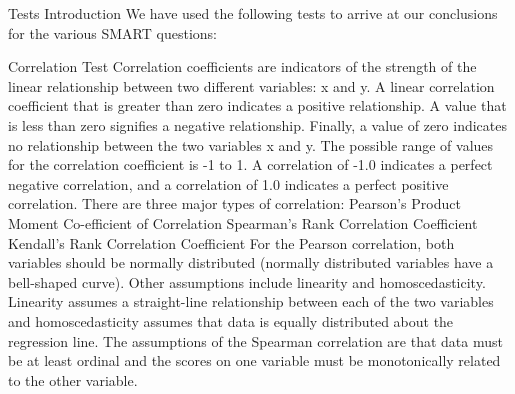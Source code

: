 \documentclass[
  ignorenonframetext,
]{beamer}
\begin{document}
\begin{frame}{Tests Introduction}
\protect\hypertarget{tests-introduction}{}
We have used the following tests to arrive at our conclusions for the
various SMART questions:

\begin{block}{Correlation Test}
\protect\hypertarget{correlation-test}{}
Correlation coefficients are indicators of the strength of the linear
relationship between two different variables: x and y. A linear
correlation coefficient that is greater than zero indicates a positive
relationship. A value that is less than zero signifies a negative
relationship. Finally, a value of zero indicates no relationship between
the two variables x and y. The possible range of values for the
correlation coefficient is -1 to 1. A correlation of -1.0 indicates a
perfect negative correlation, and a correlation of 1.0 indicates a
perfect positive correlation. There are three major types of
correlation: Pearson's Product Moment Co-efficient of Correlation
Spearman's Rank Correlation Coefficient Kendall's Rank Correlation
Coefficient For the Pearson correlation, both variables should be
normally distributed (normally distributed variables have a bell-shaped
curve). Other assumptions include linearity and homoscedasticity.
Linearity assumes a straight-line relationship between each of the two
variables and homoscedasticity assumes that data is equally distributed
about the regression line. The assumptions of the Spearman correlation
are that data must be at least ordinal and the scores on one variable
must be monotonically related to the other variable.
\end{block}


\end{frame}
\end{document}
